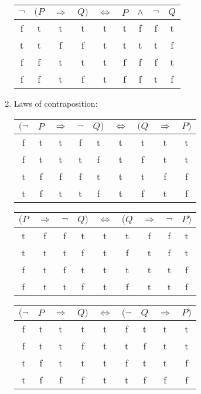 \documentclass[leqno]{article}
\renewcommand{\iff}{\Leftrightarrow}
\renewcommand{\implies}{\Rightarrow}
\begin{document}
\begin{enumerate}
\begin{tabular}{ccccccccc}
  \hline
  $\neg$ & $(P$ & $\implies$ & $Q)$ & $\iff$ & $P$ & $\land$ & $\neg$ & $Q$ \\
  \hline
     f   &   t  &      t     &  t   &    t   &  t  &    f    &    f   &  t  \\
     t   &   t  &      f     &  f   &    t   &  t  &    t    &    t   &  f  \\
     f   &   f  &      t     &  t   &    t   &  f  &    f    &    f   &  t  \\
     f   &   f  &      t     &  f   &    t   &  f  &    f    &    t   &  f  \\
  \hline
\end{tabular}

\item Laws of contraposition:

\begin{tabular}{ccccccccc}
  \hline
  $(\neg$ & $P$ & $\implies$ & $\neg$ & $Q)$ & $\iff$ & $(Q$ & $\implies$ & $P)$ \\
  \hline
      f   &  t  &      t     &    f   &  t   &    t   &   t  &      t     &  t   \\
      f   &  t  &      t     &    t   &  f   &    t   &   f  &      t     &  t   \\
      t   &  f  &      f     &    f   &  t   &    t   &   t  &      f     &  f   \\
      t   &  f  &      t     &    t   &  f   &    t   &   f  &      t     &  f   \\
  \hline
\end{tabular}

\begin{tabular}{ccccccccc}
  \hline
  $(P$ & $\implies$ & $\neg$ & $Q)$ & $\iff$ & $(Q$ & $\implies$ & $\neg$ & $P)$ \\
  \hline
    t  &      f     &    f   &  t   &    t   &   t  &      f     &    f   &  t   \\
    t  &      t     &    t   &  f   &    t   &   f  &      t     &    f   &  t   \\
    f  &      t     &    f   &  t   &    t   &   t  &      t     &    t   &  f   \\
    f  &      t     &    t   &  f   &    t   &   f  &      t     &    t   &  f   \\
  \hline
\end{tabular}

\begin{tabular}{ccccccccc}
  \hline
  $(\neg$ & $P$ & $\implies$ & $Q)$ & $\iff$ & $(\neg$ & $Q$ & $\implies$ & $P)$ \\
  \hline
      f   &  t  &      t     &  t   &    t   &     f   &  t  &      t     &  t   \\
      f   &  t  &      t     &  f   &    t   &     t   &  f  &      t     &  t   \\
      t   &  f  &      t     &  t   &    t   &     f   &  t  &      t     &  f   \\
      t   &  f  &      f     &  f   &    t   &     t   &  f  &      f     &  f   \\
  \hline
\end{tabular}


\end{enumerate}
\end{document}
